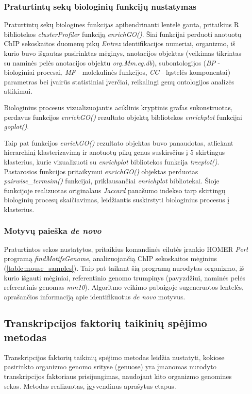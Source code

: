\documentclass[12pt]{article}
\begin{document}
\subsubsection*{Praturtintų sekų biologinių funkcijų nustatymas}
Praturtintų sekų biologines funkcijas apibendrinanti lentelė gauta, pritaikius R
bibliotekos \emph{clusterProfiler} \cite{CLUSTERPROFILER} funkciją
\emph{enrichGO()}. Šiai funkcijai perduoti anotuotų ChIP sekoskaitos duomenų
pikų \emph{Entrez} identifikacijos numeriai, organizmo, iš kurio buvo išgautas
pasirinktas mėginys, anotacijos objektas (veikimas tikrintas su naminės pelės
anotacijos objektu \emph{org.Mm.eg.db}), subontologijos (\emph{BP} -
biologiniai procesai, \emph{MF} - molekulinės funkcijos, \emph{CC} - ląstelės
komponentai) parametras bei įvairūs statistiniai įverčiai, reikalingi genų
ontologijos analizės atlikimui.

Biologinius procesus vizualizuojantis aciklinis kryptinis grafas sukonstruotas,
perdavus funkcijos \emph{enrichGO()} rezultato objektą bibliotekos
\emph{enrichplot} \cite{ENRICHPLOT} funkcijai \emph{goplot()}.

Taip pat funkcijos \emph{enrichGO()} rezultato objektas buvo panaudotas,
atliekant hierarchinį klasterizavimą ir anotuotų pikų genus suskirsčius į
5 skirtingus klasterius, kurie vizualizuoti su \emph{enrichplot} bibliotekos
funkcija \emph{treeplot()}. Pastarosios funkcijos pritaikymui \emph{enrichGO()}
objektas perduotas \emph{pairwise\_termsim()} funkcijai, priklausančiai
\emph{enrichplot} bibliotekai. Šioje funkcijoje realizuotas originalaus
\emph{Jaccard} panašumo indekso tarp skirtingų biologinių procesų skaičiavimas,
leidžiantis suskirstyti biologinius procesus į klasterius.

\subsubsection*{Motyvų paieška \emph{de novo}}
Praturtintos sekos nustatytos, pritaikius komandinės eilutės įrankio
HOMER \cite{HOMER} \emph{Perl} programą \emph{findMotifsGenome}, analizuojančią
ChIP sekoskaitos mėginius (\ref{table:mouse_samples}). Taip pat taikant
šią programą nurodytas organizmo, iš kurio išgauti mėginiai, referentinio genomo
trumpinys (pavyzdžiui, naminės pelės referentinis genomas \emph{mm10}).
Algoritmo veikimo pabaigoje sugeneruotos lentelės, aprašančios informaciją
apie identifikuotus \emph{de novo} motyvus.

\newpage

\subsection{Transkripcijos faktorių taikinių spėjimo metodas}
Transkripcijos faktorių taikinių spėjimo metodas leidžia nustatyti, kokiose
pasirinkto organizmo genomo srityse (genuose) yra įmanomas nurodyto
transkripcijos faktoriaus prisijungimas, naudojant kito organizmo genomines
sekas. Metodas realizuotas, įgyvendinus aprašytus etapus.
\end{document}

